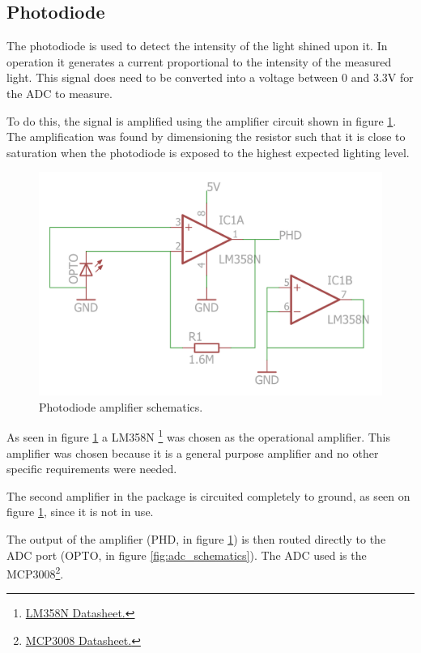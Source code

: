 

\subsection{Photodiode}
\label{sec:photodiode}

The photodiode is used to detect the intensity of the light shined upon it.
In operation it generates a current proportional to the intensity of the measured light.
This signal does need to be converted into a voltage between 0 and 3.3V for the ADC to measure.

To do this, the signal is amplified using the amplifier circuit shown in figure \ref{fig:photodiodeschematics}.
The amplification was found by dimensioning the resistor such that it is close to saturation when the photodiode is exposed to the highest expected lighting level.


\begin{figure}[H]
\centering 
\includegraphics[width = 0.6 \textwidth]{images/optoamplifier_schematics}
\caption{Photodiode amplifier schematics.}
\label{fig:photodiodeschematics}
\end{figure}

As seen in figure \ref{fig:photodiodeschematics} a LM358N \footnote{\href{http://docs-europe.electrocomponents.com/webdocs/0780/0900766b807800ef.pdf}{LM358N Datasheet.}} was chosen as the operational amplifier.
This amplifier was chosen because it is  a general purpose amplifier and no other specific requirements were needed.

The second amplifier in the package is circuited completely to ground, as seen on figure \ref{fig:photodiodeschematics}, since it is not in use.

The output of the amplifier (PHD, in figure \ref{fig:photodiodeschematics}) is then routed directly to the ADC port (OPTO, in figure \ref{fig:adc_schematics}).
The ADC used is the MCP3008\footnote{ \href{https://www.adafruit.com/datasheets/MCP3008.pdf}{MCP3008 Datasheet.} }.


